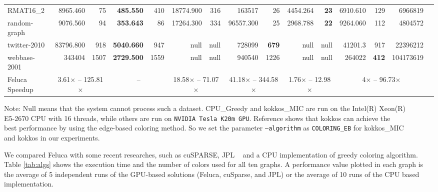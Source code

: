 \begin{table}[hpt]
\begin{threeparttable}
{\begin{tabular}{|l|r|r|r|r|r|r|r|r|r|r|r|r|r|r|}
 RMAT16\_2				&8965.460					&75						&\textbf{485.550}		&410				&18774.900	&316	&163517			&26					&4454.264		&\textbf{23}	&6910.610					&129					&6966819\\
 random-graph			&9076.560					&94						&\textbf{353.643}		&86					&17264.300	&334	&96557.300	&25					&2968.788		&\textbf{22}	&9264.060					&112					&4804572\\
 twitter-2010			&83796.800				&918					&\textbf{5040.660}	&947				&null				&null	&728099			&\textbf{679}&null			&null					&41201.3					&917	&22396212\\
 webbase-2001			&343404						&1507					&\textbf{2729.500}	&1559				&null				&null	&940540			&1226				&null			&null						&264022						&\textbf{412}	&104173619\\\hline
 Feluca Speedup		&\multicolumn{2}{c|}{3.61$\times$ -- 125.81$\times$}	&\multicolumn{2}{c|}{--}			&\multicolumn{2}{c|}{18.58$\times$ -- 71.07$\times$}		&\multicolumn{2}{c|}{41.18$\times$ -- 344.58$\times$} &\multicolumn{2}{c|}{1.76$\times$ -- 12.98$\times$}	&\multicolumn{3}{c|}{4$\times$ -- 96.73$\times$}\\\hline
\end{tabular}}
\begin{tablenotes}
\item {Note: }{Null means that the system cannot process such a dataset. CPU\_Greedy and kokkos\_MIC are run on the Intel(R) Xeon(R) \\ 
E5-2670 CPU with 16 threads, while others are run on \texttt{NVIDIA Tesla K20m GPU}. Reference \cite{Manycore} shows that kokkos can achieve the \\ 
best performance by using the edge-based coloring method. So we set the parameter \texttt{--algorithm} as \texttt{COLORING\_EB} for kokkos\_MIC \\
and kokkos in our experiments. 
}
\end{tablenotes}
\end{threeparttable}
\end{table}

We compared Feluca with some recent researches, such as cuSPARSE, JPL ~\cite{nvidiaTR} and a CPU implementation of greedy coloring algorithm. Table \ref{tab:algs} shows the execution time and the number of colors used for all ten graphs. A performance value plotted in each graph is the average of 5 independent runs of the GPU-based solutions (Feluca, cuSparse, and JPL) or the average of 10 runs of the CPU based implementation.

